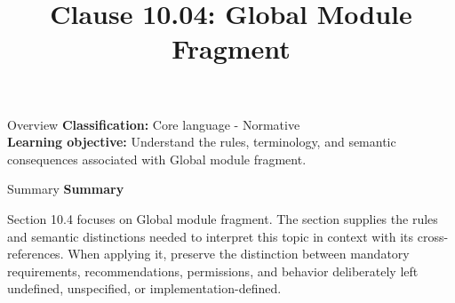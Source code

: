 \documentclass[10pt,letterpaper]{article}
\title{Clause 10.04: Global Module Fragment}
\author{}
\date{}
\begin{document}
\maketitle
\begin{CornellOverviewBox}{Overview}
\textbf{Classification:} Core language - Normative\\[2pt]
\textbf{Learning objective:} Understand the rules, terminology, and semantic consequences associated with Global module fragment.
\end{CornellOverviewBox}\begin{CornellSummaryBox}{Summary}
{\sffamily\bfseries\color{Accent} Summary}\par\vspace{3pt}Section 10.4 focuses on Global module fragment. The section supplies the rules and semantic distinctions needed to interpret this topic in context with its cross-references. When applying it, preserve the distinction between mandatory requirements, recommendations, permissions, and behavior deliberately left undefined, unspecified, or implementation-defined.
\end{CornellSummaryBox}
\end{document}
